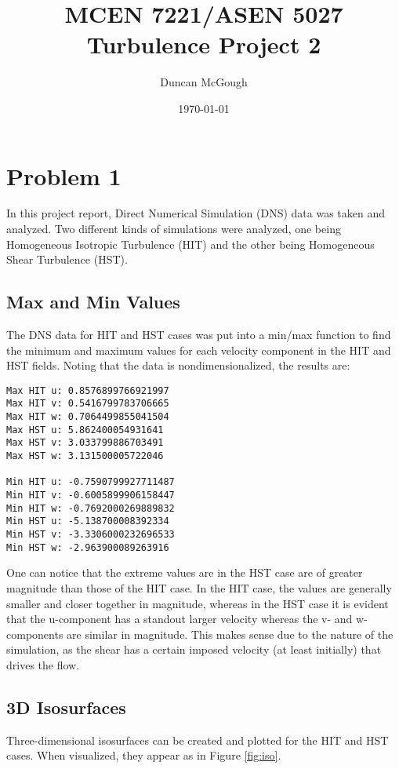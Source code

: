 \documentclass[12pt]{article}
\title{MCEN 7221/ASEN 5027 Turbulence Project 2}
\author{Duncan McGough}
\date{\today}
\begin{document}
\maketitle

\tableofcontents
\listoffigures
\newpage

\section{Problem 1}
In this project report, Direct Numerical Simulation (DNS) data was taken and analyzed. Two different kinds of simulations were analyzed, one being Homogeneous Isotropic Turbulence (HIT) and the other being Homogeneous Shear Turbulence (HST). 

\subsection{Max and Min Values}
The DNS data for HIT and HST cases was put into a min/max function to find the minimum and maximum values for each velocity component in the HIT and HST fields. Noting that the data is nondimensionalized, the results are:
\begin{lstlisting}
Max HIT u: 0.8576899766921997
Max HIT v: 0.5416799783706665
Max HIT w: 0.7064499855041504
Max HST u: 5.862400054931641
Max HST v: 3.033799886703491
Max HST w: 3.131500005722046

Min HIT u: -0.7590799927711487
Min HIT v: -0.6005899906158447
Min HIT w: -0.7692000269889832
Min HST u: -5.138700008392334
Min HST v: -3.3306000232696533
Min HST w: -2.963900089263916
\end{lstlisting}

One can notice that the extreme values are in the HST case are of greater magnitude than those of the HIT case. In the HIT case, the values are generally smaller and closer together in magnitude, whereas in the HST case it is evident that the u-component has a standout larger velocity whereas the v- and w-components are similar in magnitude. This makes sense due to the nature of the simulation, as the shear has a certain imposed velocity (at least initially) that drives the flow. 

\subsection{3D Isosurfaces}
Three-dimensional isosurfaces can be created and plotted for the HIT and HST cases. When visualized, they appear as in Figure \ref{fig:iso}.
\end{document}
